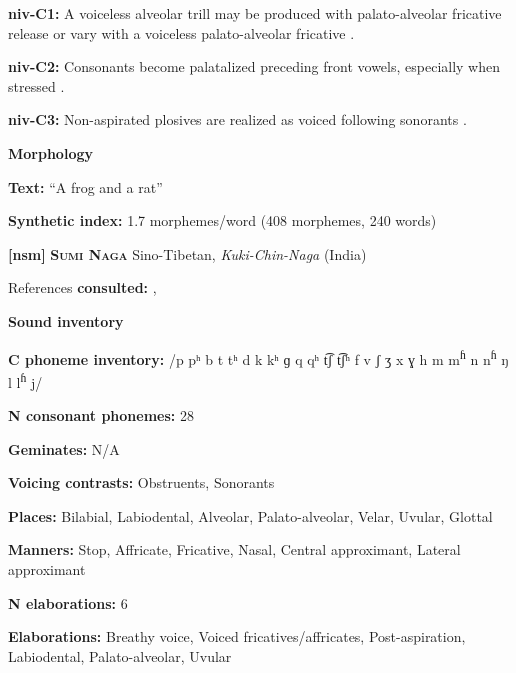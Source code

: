 \textbf{niv-C1:} A voiceless alveolar trill may be produced with palato-alveolar fricative release or vary with a voiceless palato-alveolar fricative \citep[26]{Shiraishi2006}.



\textbf{niv-C2:} Consonants become palatalized preceding front vowels, especially when stressed \citep[23]{Shiraishi2006}.



\textbf{niv-C3:} Non-aspirated plosives are realized as voiced following sonorants \citep[25]{Shiraishi2006}.



\textbf{Morphology}



\textbf{Text:} “A frog and a rat” \citep[58-61]{Gruzdeva1998}



\textbf{Synthetic index:} 1.7 morphemes/word (408 morphemes, 240 words)



\textbf{[nsm]}   \textbf{\textsc{Sumi Naga}}  Sino-Tibetan, \textit{Kuki-Chin-Naga} (India)



References \textbf{consulted:} \citet{Teo2009}, \citet{Teo2012}



\textbf{Sound inventory}



\textbf{C phoneme inventory:} /p pʰ b t tʰ d k kʰ ɡ q qʰ t͡ʃ t͡ʃʰ f v ʃ ʒ x ɣ h m m\textsuperscript{ɦ} n n\textsuperscript{ɦ} ŋ l l\textsuperscript{ɦ} j/



\textbf{N consonant phonemes:} 28



\textbf{Geminates:} N/A



\textbf{Voicing contrasts:} Obstruents, Sonorants



\textbf{Places:} Bilabial, Labiodental, Alveolar, Palato-alveolar, Velar, Uvular, Glottal



\textbf{Manners:} Stop, Affricate, Fricative, Nasal, Central approximant, Lateral approximant



\textbf{N elaborations:} 6



\textbf{Elaborations:} Breathy voice, Voiced fricatives/affricates, Post-aspiration, Labiodental, Palato-alveolar, Uvular



